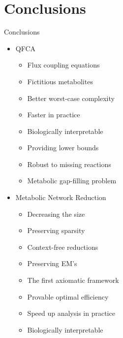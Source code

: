 \documentclass[10pt]{beamer}
\theoremstyle{remark}
\theoremstyle{definition}
\begin{document}
\section{Conclusions}
\begin{frame}{Conclusions}{}
  \begin{multicols}{2}
	\begin{itemize}
		\item<1-> QFCA
		\begin{itemize}
			\item<2-> Flux coupling equations
			\item<3-> Fictitious metabolites
			\item<4-> Better worst-case complexity
			\item<5-> Faster in practice
			\item<6-> Biologically interpretable 
			\item<7-> Providing lower bounds
			\item<8-> Robust to missing reactions
			\item<9-> Metabolic gap-filling problem
		\end{itemize}
		\item<10-> Metabolic Network Reduction 
		\begin{itemize}
			\item<11-> Decreasing the size
			\item<12-> Preserving sparsity
			\item<13-> Context-free reductions
			\item<14-> Preserving EM's 
			\item<15-> The first axiomatic framework
			\item<16-> Provable optimal efficiency 
			\item<17-> Speed up analysis in practice 
			\item<18-> Biologically interpretable
		\end{itemize}
	\end{itemize}
  \end{multicols}	
\end{frame}

\end{document}
